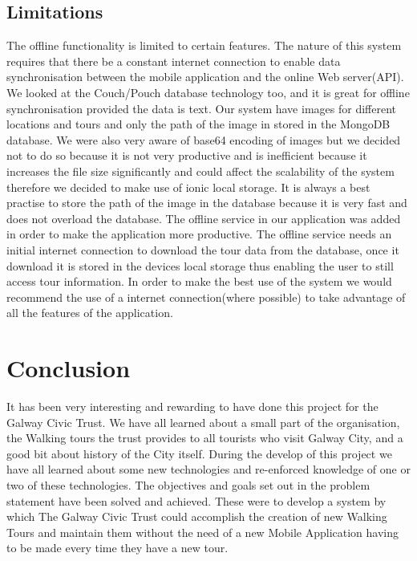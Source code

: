 	\section{Limitations}
	The offline functionality is limited to certain features. The nature of this system requires that there be a constant internet connection to enable data synchronisation between the mobile application and the online Web server(API). We looked at the Couch/Pouch database technology too, and it is great for offline synchronisation provided the data is text. Our system have images for different locations and tours and only the path of the image in stored in the MongoDB database. We were also very aware of base64 encoding of images but we decided not to do so because it is not very productive and  is inefficient  because it increases the file size significantly and could affect the scalability of the system therefore we decided to make use of ionic local storage. It is always a best practise to store the path of the image in the database because it is very fast and does not overload the database.  
	The offline service in our application was added in order to make the application more productive. The offline service needs an initial internet connection to download the tour data from the database, once it download it is stored in the devices local storage thus enabling the user to still access tour information.
	In order to make the best use of the system we would recommend the use of a internet connection(where possible) to take advantage of all the features of the application. 


\chapter{Conclusion}
It has been very interesting and rewarding to have done this project for the Galway Civic Trust. We have all learned about a small part of the organisation, the Walking tours the trust provides to all tourists who visit Galway City, and a good bit about history of the City itself.   
During the develop of this project we have all learned about some new technologies and re-enforced knowledge of one or two of these technologies.
The objectives and goals set out in the problem statement have been solved and achieved. These were to develop a system by which The Galway Civic Trust could accomplish the creation of new Walking Tours and maintain them without the need of a new Mobile Application having to be made every time they have a new tour.

